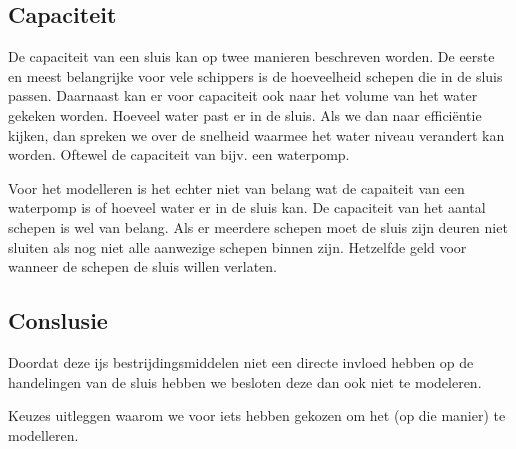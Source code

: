 \documentclass{article}
\begin{document}
\vskip0.5cm

\subsection{Capaciteit}
De capaciteit van een sluis kan op twee manieren beschreven worden. De eerste en meest belangrijke voor vele schippers is de hoeveelheid schepen die in de sluis passen.
Daarnaast kan er voor capaciteit ook naar het volume van het water gekeken worden. Hoeveel water past er in de sluis.
Als we dan naar efficiëntie kijken, dan spreken we over de snelheid waarmee het water niveau verandert kan worden. Oftewel de capaciteit van bijv. een waterpomp.

Voor het modelleren is het echter niet van belang wat de capaiteit van een waterpomp is of hoeveel water er in de sluis kan. De capaciteit van het aantal schepen is wel van belang. Als er meerdere schepen moet de sluis zijn deuren niet sluiten als nog niet alle aanwezige schepen binnen zijn. Hetzelfde geld voor wanneer de schepen de sluis willen verlaten.

\subsection{Conslusie}
Doordat deze ijs bestrijdingsmiddelen niet een directe invloed hebben op de handelingen van de sluis hebben we besloten deze dan ook niet te modeleren.

{\large \color{red}Keuzes uitleggen waarom we voor iets hebben gekozen om het (op die manier) te modelleren.}
\clearpage
\end{document}
